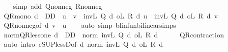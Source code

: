 \begin{isabellebody}
%
\isadelimproof
\ \ %
\endisadelimproof
%
\isatagproof
{}\isamarkupfalse%
\ {\isacharparenleft}{\kern0pt}simp\ add{\isacharcolon}{\kern0pt}\ Q{\isacharunderscore}{\kern0pt}nonneg\ R{\isacharunderscore}{\kern0pt}nonneg{\isacharparenright}{\kern0pt}%
\endisatagproof
{\isafoldproof}%
%
\isadelimproof
\isanewline
%
\endisadelimproof
\isanewline
{}\isamarkupfalse%
\ QR{\isacharunderscore}{\kern0pt}mono{\isacharcolon}{\kern0pt}\ {\isachardoublequoteopen}d\ {\isasymin}\ D\isactrlsub D\ {\isasymLongrightarrow}\ u\ {\isasymle}\ v\ {\isasymLongrightarrow}\ {\isacharparenleft}{\kern0pt}inv\isactrlsub L\ {\isacharparenleft}{\kern0pt}Q\ d{\isacharparenright}{\kern0pt}\ o\isactrlsub L\ R\ d{\isacharparenright}{\kern0pt}\ u\ {\isasymle}\ {\isacharparenleft}{\kern0pt}inv\isactrlsub L\ {\isacharparenleft}{\kern0pt}Q\ d{\isacharparenright}{\kern0pt}\ o\isactrlsub L\ R\ d{\isacharparenright}{\kern0pt}\ v{\isachardoublequoteclose}\isanewline
%
\isadelimproof
\ \ %
\endisadelimproof
%
\isatagproof
{}\isamarkupfalse%
\ QR{\isacharunderscore}{\kern0pt}nonneg{\isacharbrackleft}{\kern0pt}of\ d\ {\isachardoublequoteopen}v\ {\isacharminus}{\kern0pt}\ u{\isachardoublequoteclose}{\isacharbrackright}{\kern0pt}\isanewline
\ \ \isamarkupfalse%
\ {\isacharparenleft}{\kern0pt}auto\ simp{\isacharcolon}{\kern0pt}\ blinfun{\isachardot}{\kern0pt}bilinear{\isacharunderscore}{\kern0pt}simps{\isacharparenright}{\kern0pt}%
\endisatagproof
{\isafoldproof}%
%
\isadelimproof
\isanewline
%
\endisadelimproof
\isanewline
{}\isamarkupfalse%
\ norm{\isacharunderscore}{\kern0pt}QR{\isacharunderscore}{\kern0pt}less{\isacharunderscore}{\kern0pt}one{\isacharcolon}{\kern0pt}\ {\isachardoublequoteopen}d\ {\isasymin}\ D\isactrlsub D\ {\isasymLongrightarrow}\ norm\ {\isacharparenleft}{\kern0pt}inv\isactrlsub L\ {\isacharparenleft}{\kern0pt}Q\ d{\isacharparenright}{\kern0pt}\ o\isactrlsub L\ R\ d{\isacharparenright}{\kern0pt}\ {\isacharless}{\kern0pt}\ {}{\isachardoublequoteclose}\isanewline
%
\isadelimproof
\ \ %
\endisadelimproof
%
\isatagproof
{}\isamarkupfalse%
\ QR{\isacharunderscore}{\kern0pt}contraction\isanewline
\ \ \isamarkupfalse%
\ {\isacharparenleft}{\kern0pt}auto\ intro{\isacharbang}{\kern0pt}{\isacharcolon}{\kern0pt}\ cSUP{\isacharunderscore}{\kern0pt}lessD{\isacharbrackleft}{\kern0pt}of\ {\isachardoublequoteopen}{\isasymlambda}d{\isachardot}{\kern0pt}\ norm\ {\isacharparenleft}{\kern0pt}inv\isactrlsub L\ {\isacharparenleft}{\kern0pt}Q\ d{\isacharparenright}{\kern0pt}\ o\isactrlsub L\ R\ d{\isacharparenright}{\kern0pt}{\isachardoublequoteclose}{\isacharbrackright}{\kern0pt}{\isacharparenright}{\kern0pt}%

\end{isabellebody}
